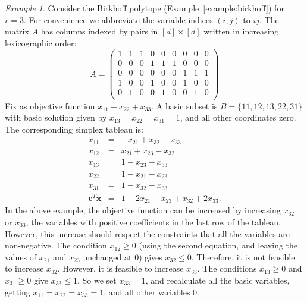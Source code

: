 \documentclass{amsbook}
\newcommand{\xx}{\mathbf x}
\newcommand{\cc}{\mathbf c}
\theoremstyle{definition}
\theoremstyle{remark}
\newtheorem{example}[theorem]{Example}
\begin{document}
\begin{example}
  \label{example:birkhoff3-tableau}
  Consider the Birkhoff polytope (Example~\ref{example:birkhoff}) for $r=3$.
  For convenience we abbreviate the variable indices $(i,j)$ to $ij$.
  The matrix $A$ has columns indexed by pairs in $[d]\times [d]$ written in increasing lexicographic order:
  \begin{displaymath}
    A =
    \begin{pmatrix}
      1 & 1 & 1 & 0 & 0 & 0 & 0 & 0 & 0\\
      0 & 0 & 0 & 1 & 1 & 1 & 0 & 0 & 0\\
      0 & 0 & 0 & 0 & 0 & 0 & 1 & 1 & 1\\
      1 & 0 & 0 & 1 & 0 & 0 & 1 & 0 & 0\\
      0 & 1 & 0 & 0 & 1 & 0 & 0 & 1 & 0\\
    \end{pmatrix}
  \end{displaymath}
  Fix as objective function $x_{11}+x_{22}+x_{33}$.
  A basic subset is $B=\{11,12,13,22,31\}$ with basic solution given by $x_{13}=x_{22}=x_{31}=1$, and all other coordinates zero.
  The corresponding simplex tableau is:
  \begin{displaymath}
    \begin{matrix}
      x_{11} & = & -x_{21} +x_{32}+x_{33}\\
      x_{12} & = & x_{21}+x_{23}-x_{32}\\
      x_{13} & = & 1-x_{23}-x_{33}\\
      x_{22} & = & 1-x_{21} -x_{23}\\
      x_{31} & = & 1-x_{32}-x_{33}\\
      \hline
      \cc^T\xx & = & 1-2x_{21}-x_{23}+x_{32}+2x_{33}.
    \end{matrix}
  \end{displaymath}
  In the above example, the objective function can be increased by increasing $x_{32}$ or $x_{33}$, the variables with positive coefficients in the last row of the tableau.
  However, this increase should respect the constraints that all the variables are non-negative.
  The condition $x_{12}\geq 0$ (using the second equation, and leaving the values of $x_{21}$ and $x_{23}$ unchanged at $0$) gives $x_{32}\leq 0$.
  Therefore, it is not feasible to increase $x_{32}$.
  However, it is feasible to increase $x_{33}$.
  The conditions $x_{13}\geq 0$ and $x_{31}\geq 0$ give $x_{33}\leq 1$.
  So we set $x_{33}=1$, and recalculate all the basic variables, getting $x_{11}=x_{22}=x_{33}=1$, and all other variables $0$.

\end{example}
\end{document}
